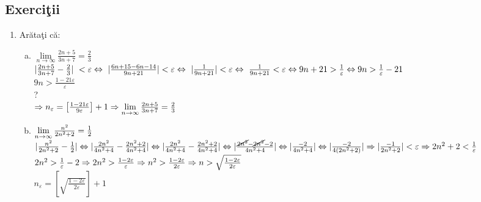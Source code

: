 \documentclass[a4paper, 12pt, notitlepage]{book}
\begin{document}
    \subsection{Exerci\c{t}ii}
    \begin{enumerate}
      \item {Ar\u{a}ta\c{t}i c\u{a}:}
            \begin{enumerate}[a.]
              \item $\lim\limits_{n\to\infty} \frac{2n+5}{3n+7} = \frac{2}{3}$\\[5pt]
                    $\lvert \frac{2n+5}{3n+7} - \frac{2}{3} \rvert\ < \varepsilon \Leftrightarrow\ \lvert \frac{6n+15-6n-14}{9n+21} \rvert < \varepsilon \Leftrightarrow\ \lvert \frac{1}{9n+21} \rvert < \varepsilon \Leftrightarrow\ \frac{1}{9n+21} < \varepsilon \Leftrightarrow 9n+21 > {1 \over \varepsilon} \Leftrightarrow 9n > {1 \over \varepsilon} - 21$\\[5pt]

                    $9n > \frac{1-21 \varepsilon}{\varepsilon}$\\[5pt]
                    ?\\[5pt]
                     $\Rightarrow n_{\varepsilon} = \left[ \frac{1-21 \varepsilon}{9 \varepsilon} \right] + 1 \Rightarrow \lim\limits_{n\to\infty} \frac{2n+5}{3n+7} = {2\over 3}$

              \item $\lim\limits_{n\to\infty} \frac{n^{2}}{2n^{2} + 2} = {1 \over 2}$\\[5pt]
                    $\lvert \frac{n^{2}}{2n^{2}+2} - {1 \over 2} \rvert \Leftrightarrow \lvert \frac{2n^{2}}{4n^{2}+4} - \frac{2n^{2}+2}{4n^{2}+4} \rvert \Leftrightarrow \lvert \frac{2n^{2}}{4n^{2}+4} - \frac{2n^{2}+2}{4n^{2}+4} \rvert \Leftrightarrow \lvert \frac{\cancel{2n^{2}} - \cancel {2n^{2}} - 2}{4n^{2} +4} \rvert \Leftrightarrow \lvert \frac{-2}{4n^{2}+4} \rvert \Leftrightarrow \lvert \frac{-2}{4(2n^{2}+2)} \rvert \Rightarrow \lvert \frac{-1}{2n^{2}+2} \rvert < \varepsilon \Rightarrow 2n^{2} +2 < {1 \over \varepsilon}$\\[5pt]
                    $2n^{2} > {1 \over \varepsilon} - 2 \Rightarrow 2n^{2} > \frac{1-2\varepsilon}{\varepsilon} \Rightarrow n^{2} > \frac{1-2\varepsilon}{2\varepsilon} \Rightarrow n > \sqrt{\frac{1-2\varepsilon}{2\varepsilon}}$\\[5pt]
                    $n_{\varepsilon} = \left[ \sqrt{\frac{1-2\varepsilon}{2\varepsilon}} \right] + 1$
            \end{enumerate}
    \end{enumerate}
\end{document}
